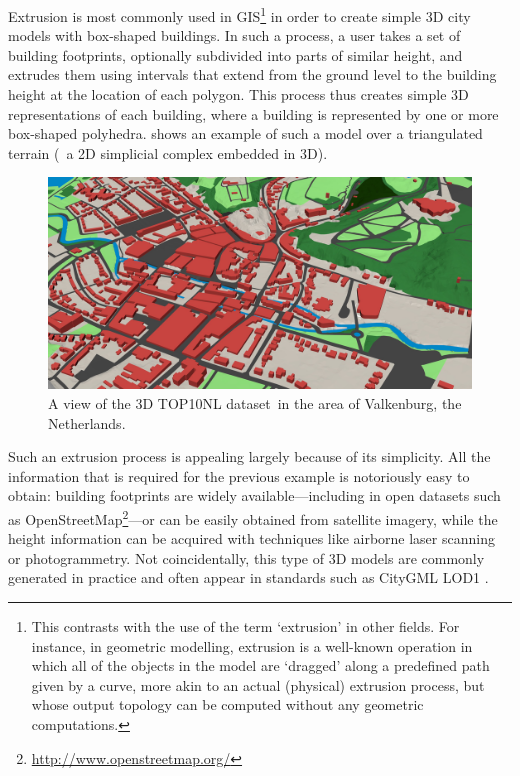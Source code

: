 Extrusion is most commonly used in GIS\footnote{This contrasts with the use of the term `extrusion' in other fields.
For instance, in geometric modelling, extrusion is a well-known operation in which all of the objects in the model are `dragged' along a predefined path given by a curve, more akin to an actual (physical) extrusion process, but whose output topology can be computed without any geometric computations.} in order to create simple 3D city models with box-shaped buildings.
In such a process, a user takes a set of building footprints, optionally subdivided into parts of similar height, and extrudes them using intervals that extend from the ground level to the building height at the location of each polygon.
This process thus creates simple 3D representations of each building, where a building is represented by one or more box-shaped polyhedra.
 shows an example of such a model over a triangulated terrain (\ie\ a 2D simplicial complex embedded in 3D).
\begin{figure}
\centering
\includegraphics[width=\linewidth]{figs/3dtop10nl}
\caption[A view of the 3D TOP10NL dataset]{A view of the 3D TOP10NL dataset\protect\footnotemark\ in the area of Valkenburg, the Netherlands.}
\label{fig:3dtop10nl}
\end{figure}

Such an extrusion process is appealing largely because of its simplicity.
All the information that is required for the previous example is notoriously easy to obtain: building footprints are widely available---including in open datasets such as OpenStreetMap\footnote{\url{http://www.openstreetmap.org/}}---or can be easily obtained from satellite imagery, while the height information can be acquired with techniques like airborne laser scanning or photogrammetry.
Not coincidentally, this type of 3D models are commonly generated in practice and often appear in standards such as CityGML LOD1 \citep{CityGML2}.


